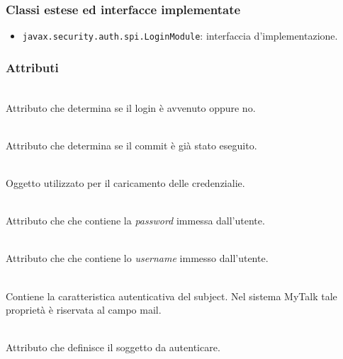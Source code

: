\subsubsection*{Classi estese ed interfacce implementate}
\begin{itemize}
	\item \texttt{javax.security.auth.spi.LoginModule}: interfaccia d'implementazione.
\end{itemize}

\subsubsection*{Attributi}
\begin{description}
  \item{}\\
  Attributo che determina se il login è avvenuto oppure no.
  \item{}\\
  Attributo che determina se il commit è già stato eseguito.
  \item{}\\
  Oggetto utilizzato per il caricamento delle credenzialie.
  \item{}\\
  Attributo che che contiene la \textit{password} immessa dall'utente.
  \item{}\\
   Attributo che che contiene lo \textit{username} immesso dall'utente.
  \item{}\\
  Contiene la caratteristica autenticativa del subject. Nel sistema MyTalk tale proprietà è riservata al campo mail.
  \item{}\\
  Attributo che definisce il soggetto da autenticare.
\end{description}


